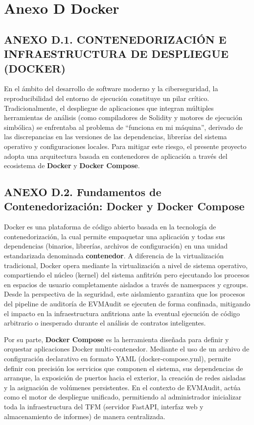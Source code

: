 \section{Anexo D Docker}\label{anexo-d-docker}

\subsection{ANEXO D.1. CONTENEDORIZACIÓN E INFRAESTRUCTURA DE DESPLIEGUE
(DOCKER)}\label{anexo-d.1.-contenedorizaciuxf3n-e-infraestructura-de-despliegue-docker}

En el ámbito del desarrollo de software moderno y la ciberseguridad, la
reproducibilidad del entorno de ejecución constituye un pilar crítico.
Tradicionalmente, el despliegue de aplicaciones que integran múltiples
herramientas de análisis (como compiladores de Solidity y motores de
ejecución simbólica) se enfrentaba al problema de ``funciona en mi
máquina'', derivado de las discrepancias en las versiones de las
dependencias, librerías del sistema operativo y configuraciones locales.
Para mitigar este riesgo, el presente proyecto adopta una arquitectura
basada en contenedores de aplicación a través del ecosistema de
\textbf{Docker} y \textbf{Docker Compose}.

\subsection{ANEXO D.2. Fundamentos de Contenedorización: Docker y Docker
Compose}\label{anexo-d.2.-fundamentos-de-contenedorizaciuxf3n-docker-y-docker-compose}

Docker es una plataforma de código abierto basada en la tecnología de
contenedorización, la cual permite empaquetar una aplicación y todas sus
dependencias (binarios, librerías, archivos de configuración) en una
unidad estandarizada denominada \textbf{contenedor}. A diferencia de la
virtualización tradicional, Docker opera mediante la virtualización a
nivel de sistema operativo, compartiendo el núcleo (kernel) del sistema
anfitrión pero ejecutando los procesos en espacios de usuario
completamente aislados a través de namespaces y cgroups. Desde la
perspectiva de la seguridad, este aislamiento garantiza que los procesos
del pipeline de auditoría de EVMAudit se ejecuten de forma confinada,
mitigando el impacto en la infraestructura anfitriona ante la eventual
ejecución de código arbitrario o inesperado durante el análisis de
contratos inteligentes.

Por su parte, \textbf{Docker Compose} es la herramienta diseñada para
definir y orquestar aplicaciones Docker multi-contenedor. Mediante el
uso de un archivo de configuración declarativo en formato YAML
(docker-compose.yml), permite definir con precisión los servicios que
componen el sistema, sus dependencias de arranque, la exposición de
puertos hacia el exterior, la creación de redes aisladas y la asignación
de volúmenes persistentes. En el contexto de EVMAudit, actúa como el
motor de despliegue unificado, permitiendo al administrador inicializar
toda la infraestructura del TFM (servidor FastAPI, interfaz web y
almacenamiento de informes) de manera centralizada.

